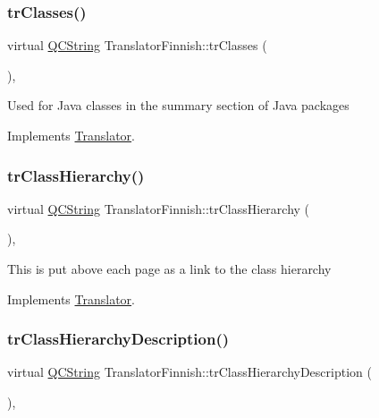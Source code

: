 \mbox{\label{class_translator_finnish_a0f15a147f57b78028a918debea190d86}} 
\subsubsection{\texorpdfstring{trClasses()}{trClasses()}}
{\footnotesize\ttfamily virtual \mbox{\hyperlink{class_q_c_string}{Q\+C\+String}} Translator\+Finnish\+::tr\+Classes (\begin{DoxyParamCaption}{ }\end{DoxyParamCaption})\hspace{0.3cm}{\ttfamily [inline]}, {\ttfamily [virtual]}}

Used for Java classes in the summary section of Java packages 

Implements \mbox{\hyperlink{class_translator}{Translator}}.

\mbox{\label{class_translator_finnish_ab3bf8bb83b24b05d038d8ebdad7cf989}} 
\subsubsection{\texorpdfstring{trClassHierarchy()}{trClassHierarchy()}}
{\footnotesize\ttfamily virtual \mbox{\hyperlink{class_q_c_string}{Q\+C\+String}} Translator\+Finnish\+::tr\+Class\+Hierarchy (\begin{DoxyParamCaption}{ }\end{DoxyParamCaption})\hspace{0.3cm}{\ttfamily [inline]}, {\ttfamily [virtual]}}

This is put above each page as a link to the class hierarchy 

Implements \mbox{\hyperlink{class_translator}{Translator}}.

\mbox{\label{class_translator_finnish_af358bb55ee3405de0168d9664dd8efcc}} 
\subsubsection{\texorpdfstring{trClassHierarchyDescription()}{trClassHierarchyDescription()}}
{\footnotesize\ttfamily virtual \mbox{\hyperlink{class_q_c_string}{Q\+C\+String}} Translator\+Finnish\+::tr\+Class\+Hierarchy\+Description (\begin{DoxyParamCaption}{ }\end{DoxyParamCaption})\hspace{0.3cm}{\ttfamily [inline]}, {\ttfamily [virtual]}}

